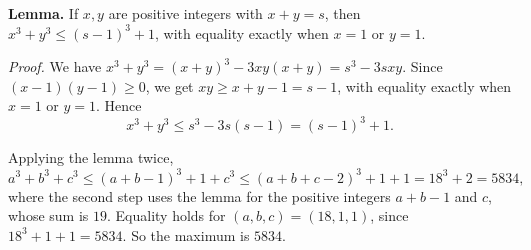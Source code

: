 \textbf{Lemma.} If $x,y$ are positive integers with $x+y=s$, then $x^3+y^3\le(s-1)^3+1$, with equality exactly when $x=1$ or $y=1$.

\emph{Proof.} We have $x^3+y^3=(x+y)^3-3xy(x+y)=s^3-3sxy$. Since $(x-1)(y-1)\ge0$, we get $xy\ge x+y-1=s-1$, with equality exactly when $x=1$ or $y=1$. Hence
\[x^3+y^3\le s^3-3s(s-1)=(s-1)^3+1 .\]

Applying the lemma twice,
\[a^3+b^3+c^3\le(a+b-1)^3+1+c^3\le(a+b+c-2)^3+1+1=18^3+2=5834 ,\]
where the second step uses the lemma for the positive integers $a+b-1$ and $c$, whose sum is $19$. Equality holds for $(a,b,c)=(18,1,1)$, since $18^3+1+1=5834$. So the maximum is $\boxed{5834}$.
